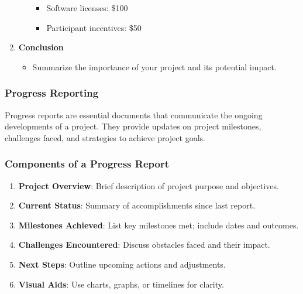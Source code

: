 \documentclass[aspectratio=169]{beamer}
\begin{document}
\begin{frame}[fragile]
\begin{enumerate}[resume]
\begin{itemize}
                \begin{itemize}
                    \item Software licenses: \$100
                    \item Participant incentives: \$50
                \end{itemize}
            \end{itemize}
        \item \textbf{Conclusion}
            \begin{itemize}
                \item Summarize the importance of your project and its potential impact.
            \end{itemize}
    \end{enumerate}
\end{frame}

\begin{frame}[fragile]
    \frametitle{Progress Reporting}
    Progress reports are essential documents that communicate the ongoing developments of a project. They provide updates on project milestones, challenges faced, and strategies to achieve project goals.
\end{frame}

\begin{frame}[fragile]
    \frametitle{Components of a Progress Report}
    \begin{enumerate}
        \item \textbf{Project Overview}: Brief description of project purpose and objectives.
        \item \textbf{Current Status}: Summary of accomplishments since last report.
        \item \textbf{Milestones Achieved}: List key milestones met; include dates and outcomes.
        \item \textbf{Challenges Encountered}: Discuss obstacles faced and their impact.
        \item \textbf{Next Steps}: Outline upcoming actions and adjustments.
        \item \textbf{Visual Aids}: Use charts, graphs, or timelines for clarity.
    \end{enumerate}
\end{frame}
\end{document}
